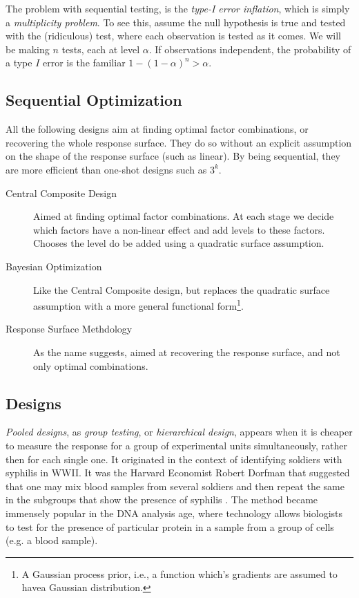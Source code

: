 The problem with sequential testing, is the \emph{type-I error inflation}, which is simply a \emph{multiplicity problem}.
To see this, assume the null hypothesis is true and tested with the (ridiculous) test, where each observation is tested as it comes. 
We will be making $n$ tests, each at level $\alpha$.
If observations independent, the probability of a type $I$ error is the familiar $1-(1-\alpha)^n > \alpha$.






\subsection{Sequential Optimization}

All the following designs aim at finding optimal factor combinations, or recovering the whole response surface. 
They do so without an explicit assumption on the shape of the response surface (such as linear). 
By being sequential, they are more efficient than one-shot designs such as $3^k$. 


\begin{description}
	\item[Central Composite Design] 
	Aimed at finding optimal factor combinations. 
	At each stage we decide which factors have a non-linear effect and add levels to these factors. 
	Chooses the level do be added using a quadratic surface assumption.
	
	\item[Bayesian Optimization] Like the Central Composite design, but replaces the quadratic surface assumption with a more general functional form\footnote{A Gaussian process prior, i.e., a function which's gradients are assumed to havea Gaussian distribution.}. 
	
	\item[Response Surface Methdology] As the name suggests, aimed at recovering the response surface, and not only optimal combinations. 
\end{description}









\subsection{Designs}
\emph{Pooled designs}, \aka as \emph{group testing}, or \emph{hierarchical design}, appears when it is cheaper to measure the response for a group of experimental units simultaneously, rather then for each single one. 
It originated in the context of identifying soldiers with syphilis in WWII. It was the Harvard Economist Robert Dorfman that suggested that one may mix blood samples from several soldiers and then repeat the same in the subgroups that show the presence of syphilis \citep{dorfman_detection_1943}. 
The method became immensely popular in the DNA analysis age, where technology allows biologists to test for the presence of particular protein in a sample from a group of cells (e.g. a blood sample). 


